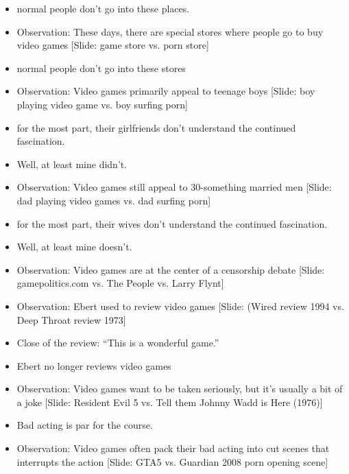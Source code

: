 \documentclass[12pt]{article}
\begin{document}
{\begin{itemize}
\item normal people don't go into these places.



\item Observation:  These days, there are special stores where people go to buy video games [Slide: game store vs. porn store]

\item normal people don't go into these stores







\item Observation: Video games primarily appeal to teenage boys [Slide:  boy playing video game vs. boy surfing porn]

\item for the most part, their girlfriends don't understand the continued fascination.  

\item Well, at least mine didn't.


\item Observation: Video games still appeal to 30-something married men [Slide: dad playing video games vs. dad surfing porn]

\item for the most part, their wives don't understand the continued fascination.
\item Well, at least mine doesn't.


\item Observation: Video games are at the center of a censorship debate [Slide: gamepolitics.com vs. The People vs. Larry Flynt]


\item Observation: Ebert used to review video games [Slide:  (Wired review 1994 vs. Deep Throat review 1973]

\item Close of the review:  ``This is a wonderful game.''

\item Ebert no longer reviews video games


\item Observation:  Video games want to be taken seriously, but it's usually a bit of a joke  [Slide:  Resident Evil 5 vs. Tell them Johnny Wadd is Here (1976)]

\item Bad acting is par for the course.

\item Observation:  Video games often pack their bad acting into cut scenes that interrupts the action [Slide:  GTA5 vs. Guardian 2008 porn opening scene]


\end{itemize}}
\end{document}
